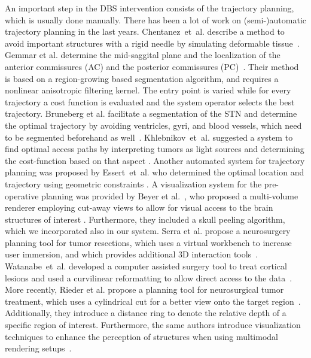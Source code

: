 \documentclass[journal]{vgtc}                %
\begin{document}
An important step in the DBS intervention consists of the trajectory planning, which is usually done manually. There has been a lot of work on (semi-)automatic trajectory planning in the last years. Chentanez~et~al. describe a method to avoid important structures with a rigid needle by simulating deformable tissue~\cite{Chentanez2009}. Gemmar et al. determine the mid-saggital plane and the localization of the anterior commissures (AC) and the posterior commissures (PC)~\cite{Gemmar2008}. Their method is based on a region-growing based segmentation algorithm, and requires a nonlinear anisotropic filtering kernel. The entry point is varied while for every trajectory a cost function is evaluated and the system operator selects the best trajectory. Bruneberg et al. facilitate a segmentation of the STN and determine the optimal trajectory by avoiding ventricles, gyri, and blood vessels, which need to be segmented beforehand as well~\cite{Brunenberg2007}. Khlebnikov~et~al. suggested a system to find optimal access paths by interpreting tumors as light sources and determining the cost-function based on that aspect \cite{Khlebnikov2011}. Another automated system for trajectory planning was proposed by Essert~et~al. who determined the optimal location and trajectory using geometric constraints \cite{Essert}. A visualization system for the pre-operative planning was provided by Beyer et al.~, who proposed a multi-volume renderer employing cut-away views to allow for visual access to the brain structures of interest \cite{Beyer2007}. Furthermore, they included a skull peeling algorithm, which we incorporated also in our system. Serra et al. propose a neurosurgery planning tool for tumor resections, which uses a virtual workbench to increase user immersion, and which provides additional 3D interaction tools~\cite{Serra1998}. Watanabe~et~al. developed a computer assisted surgery tool to treat cortical lesions and used a curvilinear reformatting to allow direct access to the data~\cite{Watanabe}.  More recently, Rieder et al. propose a planning tool for neurosurgical tumor treatment, which uses a cylindrical cut for a better view onto the target region~\cite{Rieder2008}. Additionally, they introduce a distance ring to denote the relative depth of a specific region of interest. Furthermore, the same authors introduce visualization techniques to enhance the perception of structures when using multimodal rendering setups~\cite{Rieder2008a}.
\end{document}
